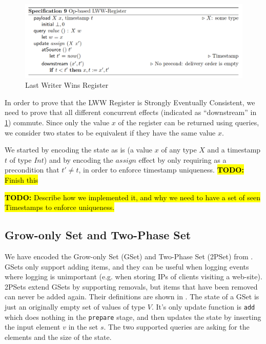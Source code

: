 \documentclass{article}
\newcommand{\TODO}[1]{\hl{\textbf{TODO:} #1}\xspace}
\begin{document}
\begin{figure}[h]
    \centering
    \includegraphics[width=\textwidth]{lww-definition}
    \caption{Last Writer Wins Register}
    \label{fig:lww-def}
\end{figure}

In order to prove that the LWW Register is Strongly Eventually
Consistent, we need to prove that all different concurrent effects
(indicated as ``downstream'' in \cref{fig:lww-def}) commute. Since
only the value $x$ of the register can be returned using queries, we
consider two states to be equivalent if they have the same value $x$.

We started by encoding the state as is (a value $x$ of any type $X$
and a timestamp $t$ of type $Int$) and by encoding the $assign$ effect
by only requiring as a precondition that $t' \neq t$, in order to
enforce timestamp uniqueness. \TODO{Finish this}




\TODO{Describe how we implemented it, and why we need to have a set of seen Timestamps to enforce uniqueness.}

\subsection{Grow-only Set and Two-Phase Set}

We have encoded the Grow-only Set (GSet) and Two-Phase Set (2PSet)
from \cite{baquero2017pure}. GSets only support adding items, and they
can be useful when logging events where logging is unimportant
(e.g. when storing IPs of clients visiting a web-site). 2PSets extend
GSets by supporting removals, but items that have been removed can
never be added again. Their definitions are shown in
. The state of a GSet is just an
originally empty set of values of type $V$. It's only update function
is \texttt{add} which does nothing in the \texttt{prepare} stage, and
then updates the state by inserting the input element $v$ in the set
$s$. The two supported queries are asking for the elements and the
size of the state.
\end{document}
